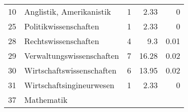 \begin{longtable}{lXrrr}
     10 &
     \multicolumn{1}{X}{ Anglistik, Amerikanistik   } &


       \num{1} &
       \num[round-mode=places,round-precision=2]{2.33} &
         \num[round-mode=places,round-precision=2]{0} \\

     25 &
     \multicolumn{1}{X}{ Politikwissenschaften   } &


       \num{1} &
       \num[round-mode=places,round-precision=2]{2.33} &
         \num[round-mode=places,round-precision=2]{0} \\

     28 &
     \multicolumn{1}{X}{ Rechtswissenschaften   } &


       \num{4} &
       \num[round-mode=places,round-precision=2]{9.3} &
         \num[round-mode=places,round-precision=2]{0.01} \\

     29 &
     \multicolumn{1}{X}{ Verwaltungswissenschaften   } &


       \num{7} &
       \num[round-mode=places,round-precision=2]{16.28} &
         \num[round-mode=places,round-precision=2]{0.02} \\

     30 &
     \multicolumn{1}{X}{ Wirtschaftswissenschaften   } &


       \num{6} &
       \num[round-mode=places,round-precision=2]{13.95} &
         \num[round-mode=places,round-precision=2]{0.02} \\

     31 &
     \multicolumn{1}{X}{ Wirtschaftsingineurwesen   } &


       \num{1} &
       \num[round-mode=places,round-precision=2]{2.33} &
         \num[round-mode=places,round-precision=2]{0} \\

     37 &
     \multicolumn{1}{X}{ Mathematik   } &



\end{longtable}
